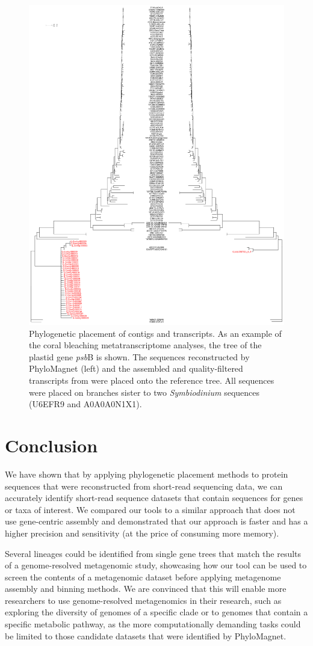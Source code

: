 \documentclass{bioinfo}
\begin{document}
\begin{figure}[!tpb]%
\centerline{\includegraphics[width=.6\textwidth]{figures/Fig4.png}}
\caption{Phylogenetic placement of contigs and transcripts. As an example of the coral bleaching metatranscriptome analyses, the tree of the plastid gene \textit{psb}B is shown. The sequences reconstructed by PhyloMagnet (left) and the assembled and quality-filtered transcripts from \citet[][right]{Frazier2017} were placed onto the reference tree. All sequences were placed on branches sister to two \textit{Symbiodinium} sequences (U6EFR9 and A0A0A0N1X1).}\label{fig:04}
\end{figure}

\section{Conclusion}
We have shown that by applying phylogenetic placement methods to protein sequences that were reconstructed from short-read sequencing data, we can accurately identify short-read sequence datasets that contain sequences for genes or taxa of interest. We compared our tools to a similar approach that does not use gene-centric assembly and demonstrated that our approach is faster and has a higher precision and sensitivity (at the price of  consuming more memory). 

Several lineages could be identified from single gene trees that match the results of a genome-resolved metagenomic study, showcasing how our tool can be used to screen the contents of a metagenomic dataset before applying metagenome assembly and binning methods. We are convinced that this will enable more researchers to use genome-resolved metagenomics in their research, such as exploring the diversity of genomes of a specific clade or to genomes that contain a specific metabolic pathway, as the more computationally demanding tasks could be limited to those candidate datasets that were identified by PhyloMagnet.
\end{document}
